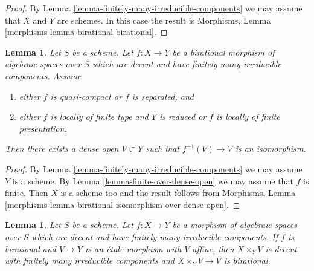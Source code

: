 \documentclass{stacks-project}
\theoremstyle{plain}
\newtheorem{lemma}[subsection]{Lemma}
\theoremstyle{definition}
\theoremstyle{remark}
\numberwithin{equation}{subsection}
\begin{document}
\begin{proof}
By Lemma \ref{lemma-finitely-many-irreducible-components} we may assume
that $X$ and $Y$ are schemes. In this case the result is
Morphisms, Lemma \ref{morphisms-lemma-birational-birational}.
\end{proof}

\begin{lemma}
\label{lemma-birational-isomorphism-over-dense-open}
Let $S$ be a scheme. Let $f : X \to Y$ be a birational morphism of
algebraic spaces over $S$ which are decent and have finitely
many irreducible components. Assume
\begin{enumerate}
\item either $f$ is quasi-compact or $f$ is separated, and
\item either $f$ is locally of finite type and $Y$ is reduced or
$f$ is locally of finite presentation.
\end{enumerate}
Then there exists a dense open $V \subset Y$
such that $f^{-1}(V) \to V$ is an isomorphism.
\end{lemma}

\begin{proof}
By Lemma \ref{lemma-finitely-many-irreducible-components} we may assume
$Y$ is a scheme. By Lemma \ref{lemma-finite-over-dense-open} we may assume
that $f$ is finite. Then $X$ is a scheme too and the result follows from
Morphisms, Lemma \ref{morphisms-lemma-birational-isomorphism-over-dense-open}.
\end{proof}

\begin{lemma}
\label{lemma-birational-etale-localization}
Let $S$ be a scheme. Let $f : X \to Y$ be a morphism of algebraic
spaces over $S$ which are decent and have finitely many irreducible
components. If $f$ is birational and $V \to Y$ is an \'etale morphism
with $V$ affine, then $X \times_Y V$ is decent with finitely
many irreducible components and $X \times_Y V \to V$ is birational.
\end{lemma}
\end{document}
